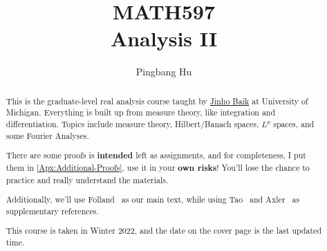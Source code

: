 \documentclass[a4paper]{report}
\author{Pingbang Hu}
\title{MATH597\\Analysis II}
\begin{document}
\maketitle

\begin{abstract}
	This is the graduate-level real analysis course taught by \href{http://www.math.lsa.umich.edu/~baik/Welcome.html}{Jinho Baik} at University of Michigan. Everything is built up from measure theory, like integration and differentiation. Topics include measure theory, Hilbert/Banach spaces, \(L^p\) spaces, and some Fourier Analyses.

	There are some proofs is \textbf{intended} left as assignments, and for completeness, I put them in \autoref{Apx:Additional-Proofs}, use it in your \textbf{own risks}! You'll lose the chance to practice and really understand the materials.

	Additionally, we'll use Folland~\cite{folland1999real} as our main text, while using Tao~\cite{tao2013introduction} and Axler~\cite{axler2019measure} as supplementary references.

	\vfill
	This course is taken in Winter 2022, and the date on the cover page is the last updated time.
\end{abstract}

\tableofcontents


\newpage
\appendix
\appendixpage{}



\newpage
\printbibliography{}
\end{document}

